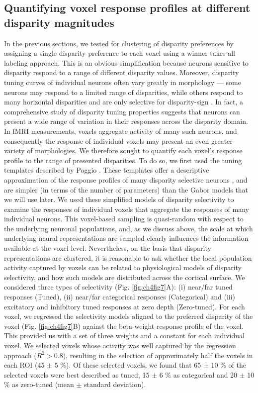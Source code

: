 \subsection{Quantifying voxel response profiles at different disparity magnitudes}
In the previous sections, we tested for clustering of disparity preferences by assigning a single disparity preference to each voxel using a winner-takes-all labeling approach. This is an obvious simplification because neurons sensitive to disparity respond to a range of different disparity values. Moreover, disparity tuning curves of individual neurons often vary greatly in morphology --- some neurons may respond to a limited range of disparities, while others respond to many horizontal disparities and are only selective for disparity-sign \cite{Poggio:1988ij,Poggio:1977ys}. In fact, a comprehensive study of disparity tuning properties suggests that neurons can present a wide range of variation in their responses across the disparity domain. In fMRI measurements, voxels aggregate activity of many such neurons, and consequently the response of individual voxels may present an even greater variety of morphologies. We therefore sought to quantify each voxel's response profile to the range of presented disparities. To do so, we first used the tuning templates described by Poggio \cite{Poggio:1988ij,Poggio:1977ys}. These templates offer a descriptive approximation of the response profiles of many disparity selective neurons \cite{DeAngelis:1999fk,Prince:2002uq}, and are simpler (in terms of the number of parameters) than the Gabor models that we will use later. We used these simplified models of disparity selectivity to examine the responses of individual voxels that aggregate the responses of many individual neurons. This voxel-based sampling is quasi-random with respect to the underlying neuronal populations, and, as we discuss above, the scale at which underlying neural representations are sampled clearly influences the information available at the voxel level. Nevertheless, on the basis that disparity representations are clustered, it is reasonable to ask whether the local population activity captured by voxels can be related to physiological models of disparity selectivity, and how such models are distributed across the cortical surface. 
We considered three types of selectivity (Fig. \ref{fig:ch4fig7}A): (i) near/far tuned responses (Tuned), (ii) near/far categorical responses (Categorical) and (iii) excitatory and inhibitory tuned responses at zero depth (Zero-tuned). For each voxel, we regressed the selectivity models aligned to the preferred disparity of the voxel (Fig. \ref{fig:ch4fig7}B) against the beta-weight response profile of the voxel. This provided us with a set of three weights and a constant for each individual voxel. We selected voxels whose activity was well captured by the regression approach ($R^2 > 0.8$), resulting in the selection of approximately half the voxels in each ROI (45 $\pm$ 5 \%). Of these selected voxels, we found that 65 $\pm$ 10 \% of the selected voxels were best described as tuned, 15 $\pm$ 6 \% as categorical and 20 $\pm$ 10 \% as zero-tuned (mean $\pm$ standard deviation).


